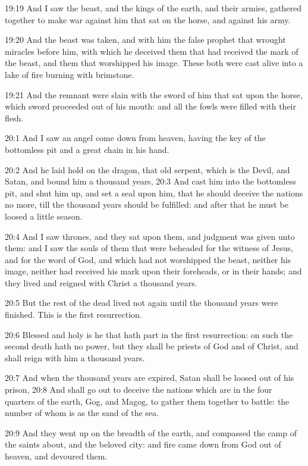 19:19 And I saw the beast, and the kings of the earth, and their armies, gathered together to make war against him that sat on the horse, and against his army.

19:20 And the beast was taken, and with him the false prophet that wrought miracles before him, with which he deceived them that had received the mark of the beast, and them that worshipped his image.  These both were cast alive into a lake of fire burning with brimstone.

19:21 And the remnant were slain with the sword of him that sat upon the horse, which sword proceeded out of his mouth: and all the fowls were filled with their flesh.

20:1 And I saw an angel come down from heaven, having the key of the bottomless pit and a great chain in his hand.

20:2 And he laid hold on the dragon, that old serpent, which is the Devil, and Satan, and bound him a thousand years, 20:3 And cast him into the bottomless pit, and shut him up, and set a seal upon him, that he should deceive the nations no more, till the thousand years should be fulfilled: and after that he must be loosed a little season.

20:4 And I saw thrones, and they sat upon them, and judgment was given unto them: and I saw the souls of them that were beheaded for the witness of Jesus, and for the word of God, and which had not worshipped the beast, neither his image, neither had received his mark upon their foreheads, or in their hands; and they lived and reigned with Christ a thousand years.

20:5 But the rest of the dead lived not again until the thousand years were finished. This is the first resurrection.

20:6 Blessed and holy is he that hath part in the first resurrection: on such the second death hath no power, but they shall be priests of God and of Christ, and shall reign with him a thousand years.

20:7 And when the thousand years are expired, Satan shall be loosed out of his prison, 20:8 And shall go out to deceive the nations which are in the four quarters of the earth, Gog, and Magog, to gather them together to battle: the number of whom is as the sand of the sea.

20:9 And they went up on the breadth of the earth, and compassed the camp of the saints about, and the beloved city: and fire came down from God out of heaven, and devoured them.

